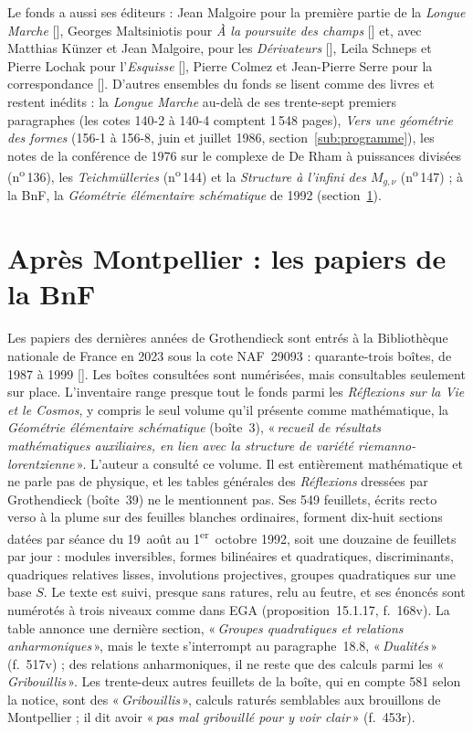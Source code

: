 \documentclass[11pt]{amsart}
\newcommand{\q}[1]{«\,\textit{#1}\,»}
\newcommand{\cote}[1]{\mbox{n\textsuperscript{o}\,#1}}
\begin{document}
Le fonds a aussi ses éditeurs : Jean Malgoire pour la première partie de la \emph{Longue Marche} [\citealp{grothendieck1995}], Georges Maltsiniotis pour \emph{À la poursuite des champs} [\citealp{maltsiniotis2022}] et, avec Matthias Künzer et Jean Malgoire, pour les \emph{Dérivateurs} [\citealp{kmm}], Leila Schneps et Pierre Lochak pour l'\emph{Esquisse} [\citealp{grothendieck1997}], Pierre Colmez et Jean-Pierre Serre pour la correspondance [\citealp{colmez2001}]. D'autres ensembles du fonds se lisent comme des livres et restent inédits : la \emph{Longue Marche} au-delà de ses trente-sept premiers paragraphes (les cotes 140-2 à 140-4 comptent 1\,548 pages), \emph{Vers une géométrie des formes} (156-1 à 156-8, juin et juillet 1986, section~\ref{sub:programme}), les notes de la conférence de 1976 sur le complexe de De Rham à puissances divisées (\cote{136}), les \emph{Teichmülleries} (\cote{144}) et la \emph{Structure à l'infini des $M_{g,\nu}$} (\cote{147}) ; à la BnF, la \emph{Géométrie élémentaire schématique} de 1992 (section~\ref{sec:bnf}).



\section{Après Montpellier : les papiers de la BnF}\label{sec:bnf}

Les papiers des dernières années de Grothendieck sont entrés à la Bibliothèque nationale de France en 2023 sous la cote NAF~29093 : quarante-trois boîtes, de 1987 à 1999 [\citealp{bnf-naf29093}]. Les boîtes consultées sont numérisées, mais consultables seulement sur place. L'inventaire range presque tout le fonds parmi les \emph{Réflexions sur la Vie et le Cosmos}, y compris le seul volume qu'il présente comme mathématique, la \emph{Géométrie élémentaire schématique} (boîte~3), \q{recueil de résultats mathématiques auxiliaires, en lien avec la structure de variété riemanno-lorentzienne}. L'auteur a consulté ce volume. Il est entièrement mathématique et ne parle pas de physique, et les tables générales des \emph{Réflexions} dressées par Grothendieck (boîte~39) ne le mentionnent pas. Ses 549 feuillets, écrits recto verso à la plume sur des feuilles blanches ordinaires, forment dix-huit sections datées par séance du 19~août au 1\textsuperscript{er}~octobre 1992, soit une douzaine de feuillets par jour : modules inversibles, formes bilinéaires et quadratiques, discriminants, quadriques relatives lisses, involutions projectives, groupes quadratiques sur une base $S$. Le texte est suivi, presque sans ratures, relu au feutre, et ses énoncés sont numérotés à trois niveaux comme dans EGA (proposition~15.1.17, f.~168v). La table annonce une dernière section, \q{Groupes quadratiques et relations anharmoniques}, mais le texte s'interrompt au paragraphe~18.8, \q{Dualités} (f.~517v) ; des relations anharmoniques, il ne reste que des calculs parmi les \q{Gribouillis}. Les trente-deux autres feuillets de la boîte, qui en compte 581 selon la notice, sont des \q{Gribouillis}, calculs raturés semblables aux brouillons de Montpellier ; il dit avoir \q{pas mal gribouillé pour y voir clair} (f.~453r).
\end{document}

